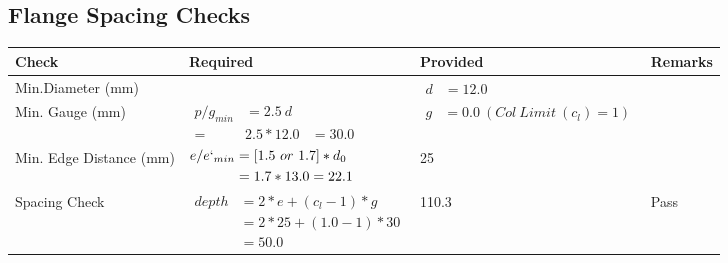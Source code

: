 \documentclass{article}%
\begin{document}
\subsection{Flange Spacing Checks}%
\label{subsec:FlangeSpacingChecks}%
\renewcommand{\arraystretch}{1.2}%
\begin{longtable}{|p{2.5cm}|p{7.5cm}|p{5cm}|p{1cm}|}%
\hline%
\rowcolor{OsdagGreen}%
Check&Required&Provided&Remarks\\%
\hline%
\endhead%
\hline%
Min.Diameter (mm)&&$\begin{aligned} d &=12.0\end{aligned}$&\\%
\hline%
Min. Gauge (mm)&$\begin{aligned}p/g_{min}&= 2.5 ~ d&\\ =&2.5*12.0&=30.0\end{aligned}$&$\begin{aligned} g &=0.0~(Col~Limit~(c_l) = 1)\end{aligned}$&\\%
\hline%
Min. Edge Distance (mm)&$\begin{aligned}e/e`_{min} &=[1.5~or~ 1.7] * d_0\\ &=1.7*13.0=22.1 \end{aligned}$&25&\\%
\hline%
Spacing Check&$\begin{aligned} depth & = 2 * e + (c_l -1) * g\\ & = 2 * 25+(1.0-1)*30\\ & = 50.0\end{aligned}$&110.3&Pass\\%
\hline%
\end{longtable}

%
\newpage%
\end{document}

